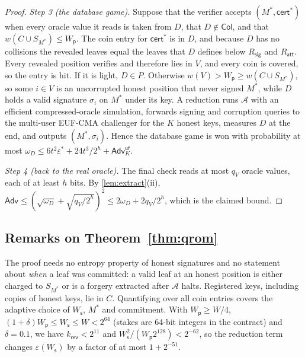 \documentclass[10pt,journal,compsoc]{IEEEtran}
\theoremstyle{tplain}
\theoremstyle{tdef}
\theoremstyle{remark}
\newcommand{\Adv}{\mathsf{Adv}}
\newcommand{\Ws}{W_{\mathsf{s}}}
\newcommand{\Wp}{W_{\mathsf{p}}}
\newcommand{\Rsig}{R_{\mathsf{sig}}}
\newcommand{\Ratt}{R_{\mathsf{att}}}
\newcommand{\kr}{k_{\mathsf{rev}}}
\newcommand{\cert}{\mathsf{cert}}
\begin{document}
\begin{proof}
\emph{Step 3 (the database game).} Suppose that the verifier accepts $(M^\ast,\cert^\ast)$ when every oracle value it reads is taken from $D$, that $D\notin\mathsf{Col}$, and that $w(C\cup S_{M^\ast})\le\Wp$. The coin entry for $\cert^\ast$ is in $D$, and because $D$ has no collisions the revealed leaves equal the leaves that $D$ defines below $\Rsig$ and $\Ratt$. Every revealed position verifies and therefore lies in $V$, and every coin is covered, so the entry is hit. If it is light, $D\in P$. Otherwise $w(V)>\Wp\ge w(C\cup S_{M^\ast})$, so some $i\in V$ is an uncorrupted honest position that never signed $M^\ast$, while $D$ holds a valid signature $\sigma_i$ on $M^\ast$ under its key. A reduction runs $\mathcal A$ with an efficient compressed-oracle simulation, forwards signing and corruption queries to the multi-user EUF-CMA challenger for the $K$ honest keys, measures $D$ at the end, and outputs $(M^\ast,\sigma_i)$. Hence the database game is won with probability at most $\omega_D\le 6t^2\varepsilon^\ast+24t^3/2^h+\Adv^{\mathsf{uf}}_K$.

\emph{Step 4 (back to the real oracle).} The final check reads at most $q_V$ oracle values, each of at least $h$ bits. By \cref{lem:extract}(ii), $\Adv\le(\sqrt{\omega_D}+\sqrt{q_V/2^h})^2\le 2\omega_D+2q_V/2^h$, which is the claimed bound.
\end{proof}

\subsection{Remarks on Theorem~\ref{thm:qrom}}\label{S-cert-remarks}
The proof needs no entropy property of honest signatures and no statement about \emph{when} a leaf was committed: a valid leaf at an honest position is either charged to $S_{M^\ast}$ or is a forgery extracted after $\mathcal A$ halts. Registered keys, including copies of honest keys, lie in $C$. Quantifying over all coin entries covers the adaptive choice of $\Ws$, $M^\ast$ and commitment. With $\Wp\ge W/4$, $(1+\delta)\Wp\le\Ws\le W<2^{64}$ (stakes are 64-bit integers in the contract) and $\delta=0.1$, we have $\kr<2^{11}$ and $\Ws^2/(\Wp2^{128})<2^{-62}$, so the reduction term changes $\varepsilon(\Ws)$ by a factor of at most $1+2^{-51}$.
\end{document}
